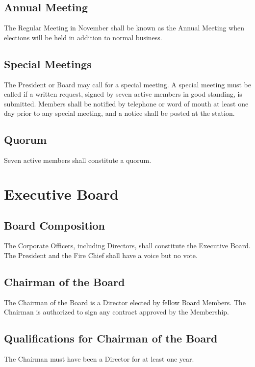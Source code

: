 ﻿\documentclass[12pt,letterpaper]{article}
\begin{document}
\subsection{Annual Meeting}
The Regular Meeting in November shall be known as the Annual Meeting when elections will be held in addition to normal business.

\subsection{Special Meetings}
The President or Board may call for a special meeting.  A special meeting must be called if a written request, signed by seven active members in good standing, is submitted.  Members shall be notified by telephone or word of mouth at least one day prior to any special meeting, and a notice shall be posted at the station.

\subsection{Quorum}
Seven active members shall constitute a quorum.

\section{Executive Board}

\subsection{Board Composition}
The Corporate Officers, including Directors, shall constitute the Executive Board.  The President and the Fire Chief shall have a voice but no vote.

\subsection{Chairman of the Board}
The Chairman of the Board is a Director elected by fellow Board Members.  The Chairman is authorized to sign any contract approved by the Membership. 

\subsection{Qualifications for Chairman of the Board}
The Chairman must have been a Director for at least one year.
\end{document}
